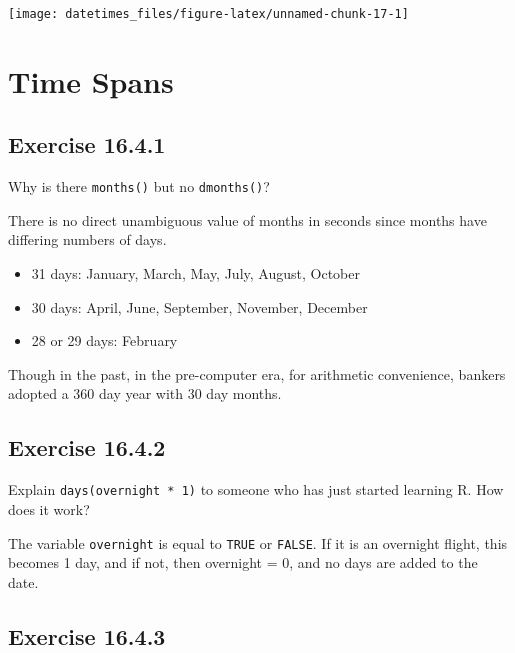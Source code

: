 \documentclass[]{book}
\providecommand{\tightlist}{%
  \setlength{\itemsep}{0pt}\setlength{\parskip}{0pt}}
\theoremstyle{plain}
\theoremstyle{remark}
\theoremstyle{definition}
\theoremstyle{definition}
\theoremstyle{definition}
\theoremstyle{remark}
\begin{document}
\begin{center}\texttt{[image: datetimes\_files/figure-latex/unnamed-chunk-17-1]} \end{center}

\hypertarget{time-spans}{%
\section{Time Spans}\label{time-spans}}

\hypertarget{exercise-16.4.1}{%
\subsection*{\texorpdfstring{Exercise
{16.4.1}}{Exercise 16.4.1}}\label{exercise-16.4.1}}

Why is there \texttt{months()} but no \texttt{dmonths()}?

There is no direct unambiguous value of months in seconds since months
have differing numbers of days.

\begin{itemize}
\tightlist
\item
  31 days: January, March, May, July, August, October
\item
  30 days: April, June, September, November, December
\item
  28 or 29 days: February
\end{itemize}

Though in the past, in the pre-computer era, for arithmetic convenience,
bankers adopted a 360 day year with 30 day months.

\hypertarget{exercise-16.4.2}{%
\subsection*{\texorpdfstring{Exercise
{16.4.2}}{Exercise 16.4.2}}\label{exercise-16.4.2}}

Explain \texttt{days(overnight\ *\ 1)} to someone who has just started
learning R. How does it work?

The variable \texttt{overnight} is equal to \texttt{TRUE} or
\texttt{FALSE}. If it is an overnight flight, this becomes 1 day, and if
not, then overnight = 0, and no days are added to the date.

\hypertarget{exercise-16.4.3}{%
\subsection*{\texorpdfstring{Exercise
{16.4.3}}{Exercise 16.4.3}}\label{exercise-16.4.3}}
\end{document}
